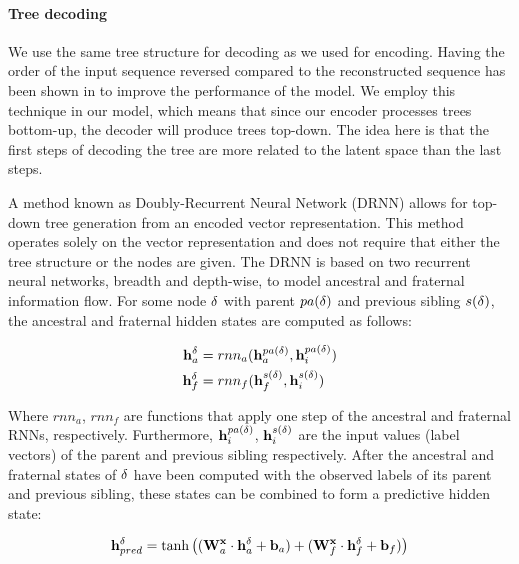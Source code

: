 \paragraph{Tree decoding} We use the same tree structure for decoding as we used for encoding. 
Having the order of the input sequence reversed compared to the reconstructed sequence has been shown in \cite{fabius2015variational} to improve the performance of the model. 
We employ this technique in our model, which means that since our encoder processes trees bottom-up, the decoder will produce trees top-down. 
The idea here is that the first steps of decoding the tree are more related to the latent space than the last steps.



A method known as Doubly-Recurrent Neural Network (DRNN) \cite{alvarezmelis2017tree} allows for top-down tree generation from an encoded vector representation. This method operates solely on the vector representation and does not require that either the tree structure or the nodes are given. The DRNN is based on two recurrent neural networks, breadth and depth-wise, to model ancestral and fraternal information flow. For some node $\delta$ with parent $pa(\delta)$ and previous sibling $s(\delta)$, the ancestral and fraternal hidden states are computed as follows:

\begin{align}
    \mathbf{h}_a^\delta &= rnn_a(\mathbf{h}_a^{pa(\delta)}, \mathbf{h}_i^{pa(\delta)}) \\ \label{eq:ancestral_update}
    \mathbf{h}_f^\delta &= rnn_f(\mathbf{h}_f^{s(\delta)}, \mathbf{h}_i^{s(\delta)}) 
\end{align}

Where $rnn_a$, $rnn_f$ are functions that apply one step of the ancestral and fraternal RNNs, respectively. Furthermore, $\mathbf{h}_i^{pa(\delta)}$, $\mathbf{h}_i^{s(\delta)}$ are the input values (label vectors) of the parent and previous sibling respectively. After the ancestral and fraternal states of $\delta$ have been computed with the observed labels of its parent and previous sibling, these states can be combined to form a predictive hidden state:

\begin{align}
    \mathbf{h}^\delta_{pred} = \tanh\left((\mathbf{W}^{\mathbf{x}}_a \cdot \mathbf{h}_a^\delta + \mathbf{b}_a) + (\mathbf{W}^{\mathbf{x}}_f \cdot \mathbf{h}_f^\delta + \mathbf{b}_f)\right)
\end{align}

